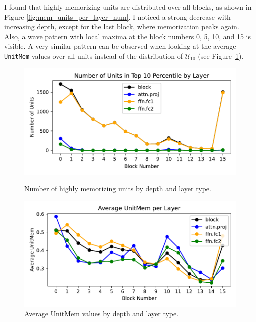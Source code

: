 \documentclass{article} %
\begin{document}
I found that highly memorizing units are distributed over all blocks, as shown in Figure \ref{fig:mem_units_per_layer_num}.
I noticed a strong decrease with increasing depth, except for the last block, where memorization peaks again.
Also, a wave pattern with local maxima at the block numbers 0, 5, 10, and 15 is visible.
A very similar pattern can be observed when looking at the average \texttt{UnitMem} values over all units instead of the distribution of $\mathcal{U}_{10}$ (see Figure~\ref{fig:mem_avg_per_layer_num}).
\begin{figure}[ht]
   \centering
   \begin{minipage}{0.48\textwidth}
      \centering
      \includegraphics[width=\textwidth]{figures/mem_units_per_layer_num.pdf}
      \caption{Number of highly memorizing units by depth and layer type.}
      \label{fig:mem_units_per_layer_num}
   \end{minipage}\hfill
   \begin{minipage}{0.48\textwidth}
      \centering
      \includegraphics[width=\textwidth]{figures/mem_avg_per_layer_num.pdf}
      \caption{Average UnitMem values by depth and layer type.}
      \label{fig:mem_avg_per_layer_num}
   \end{minipage}
\end{figure}
\end{document}

